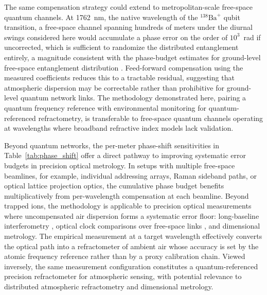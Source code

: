 \documentclass[aps,prapplied,reprint,groupedaddress,twocolumn,superscriptaddress,linenumbers]{revtex4-2}
\begin{document}
The same compensation strategy could extend to metropolitan-scale free-space quantum channels. At \SI{1762}{\nano\meter}, the native wavelength of the $^{138}\mathrm{Ba}^+$ qubit transition, a free-space channel spanning hundreds of meters under the diurnal swings considered here would accumulate a phase error on the order of $10^3$~\si{\radian} if uncorrected, which is sufficient to randomize the distributed entanglement entirely, a magnitude consistent with the phase-budget estimates for ground-level free-space entanglement distribution \cite{ursin2007entanglement}. Feed-forward compensation using the measured coefficients reduces this to a tractable residual, suggesting that atmospheric dispersion may be correctable rather than prohibitive for ground-level quantum network links. The methodology demonstrated here, pairing a quantum frequency reference with environmental monitoring for quantum-referenced refractometry, is transferable to free-space quantum channels operating at wavelengths where broadband refractive index models lack validation.

Beyond quantum networks, the per-meter phase-shift sensitivities in Table~\ref{tab:phase_shift} offer a direct pathway to improving systematic error budgets in precision optical metrology. In setups with multiple free-space beamlines, for example, individual addressing arrays, Raman sideband paths, or optical lattice projection optics, the cumulative phase budget benefits multiplicatively from per-wavelength compensation at each beamline. Beyond trapped ions, the methodology is applicable to precision optical measurements where uncompensated air dispersion forms a systematic error floor: long-baseline interferometry \cite{colavita2004effects,meiners2016overcoming}, optical clock comparisons over free-space links \cite{giorgetta2013optical,shen2022free}, and dimensional metrology. The empirical measurement at a target wavelength effectively converts the optical path into a refractometer of ambient air whose accuracy is set by the atomic frequency reference rather than by a proxy calibration chain. Viewed inversely, the same measurement configuration constitutes a quantum-referenced precision refractometer for atmospheric sensing, with potential relevance to distributed atmospheric refractometry and dimensional metrology.
\end{document}
